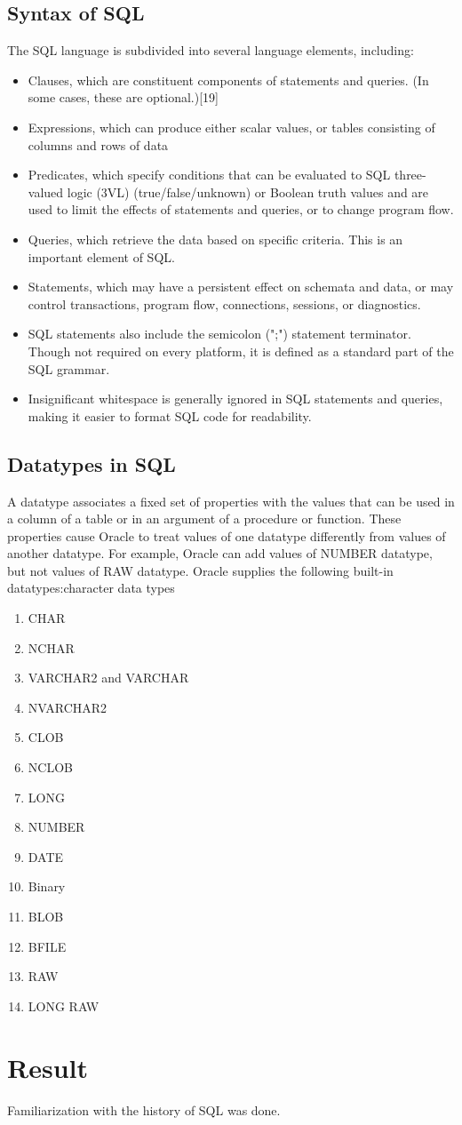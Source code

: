\subsection{Syntax of SQL}

The SQL language is subdivided into several language elements, including:
\begin{itemize}
\item Clauses, which are constituent components of statements and queries. (In some cases, these are optional.)[19]
\item Expressions, which can produce either scalar values, or tables consisting of columns and rows of data
\item Predicates, which specify conditions that can be evaluated to SQL three-valued logic (3VL) (true/false/unknown) or Boolean truth values and are used to limit the effects of statements and queries, or to change program flow.
\item Queries, which retrieve the data based on specific criteria. This is an important element of SQL.
\item Statements, which may have a persistent effect on schemata and data, or may control transactions, program flow, connections, sessions, or diagnostics.
\item SQL statements also include the semicolon (";") statement terminator. Though not required on every platform, it is defined as a standard part of the SQL grammar.
\item Insignificant whitespace is generally ignored in SQL statements and queries, making it easier to format SQL code for readability.
\end{itemize}

\subsection{Datatypes in SQL}

A datatype associates a fixed set of properties with the values that can be used in a column of a table
or in an argument of a procedure or function. These properties cause Oracle to treat values of one
datatype differently from values of another datatype. For example, Oracle can add values of
NUMBER datatype, but not values of RAW datatype.
Oracle supplies the following built-in datatypes:character data types
\begin{enumerate}
\item CHAR
\item NCHAR
\item VARCHAR2 and VARCHAR
\item NVARCHAR2
\item CLOB
\item NCLOB
\item LONG
\item NUMBER
\item DATE
\item Binary
\item BLOB
\item BFILE
\item RAW
\item LONG RAW
\end{enumerate}


\section{Result}
Familiarization with the history of SQL was done.